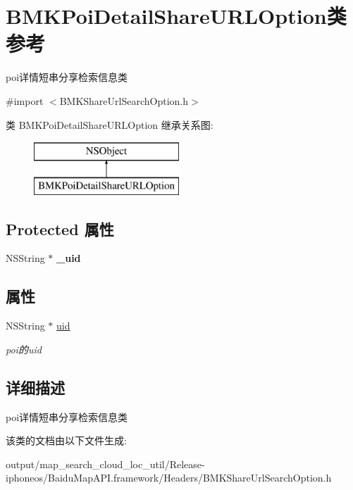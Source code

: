 \hypertarget{interface_b_m_k_poi_detail_share_u_r_l_option}{}\section{B\+M\+K\+Poi\+Detail\+Share\+U\+R\+L\+Option类 参考}
\label{interface_b_m_k_poi_detail_share_u_r_l_option}


poi详情短串分享检索信息类  




{\ttfamily \#import $<$B\+M\+K\+Share\+Url\+Search\+Option.\+h$>$}

类 B\+M\+K\+Poi\+Detail\+Share\+U\+R\+L\+Option 继承关系图\+:\begin{figure}[H]
\begin{center}
\leavevmode
\includegraphics[height=2.000000cm]{interface_b_m_k_poi_detail_share_u_r_l_option}
\end{center}
\end{figure}
\subsection*{Protected 属性}
\begin{DoxyCompactItemize}
\item 
\hypertarget{interface_b_m_k_poi_detail_share_u_r_l_option_a5c9e2a4e4a0ccda38ae749a38f74184f}{}N\+S\+String $\ast$ {\bfseries \+\_\+uid}\label{interface_b_m_k_poi_detail_share_u_r_l_option_a5c9e2a4e4a0ccda38ae749a38f74184f}

\end{DoxyCompactItemize}
\subsection*{属性}
\begin{DoxyCompactItemize}
\item 
\hypertarget{interface_b_m_k_poi_detail_share_u_r_l_option_ae0e491dbe434887138d5d6022c0ad9e2}{}N\+S\+String $\ast$ \hyperlink{interface_b_m_k_poi_detail_share_u_r_l_option_ae0e491dbe434887138d5d6022c0ad9e2}{uid}\label{interface_b_m_k_poi_detail_share_u_r_l_option_ae0e491dbe434887138d5d6022c0ad9e2}

\begin{DoxyCompactList}\small\item\em poi的uid \end{DoxyCompactList}\end{DoxyCompactItemize}


\subsection{详细描述}
poi详情短串分享检索信息类 

该类的文档由以下文件生成\+:\begin{DoxyCompactItemize}
\item 
output/map\+\_\+search\+\_\+cloud\+\_\+loc\+\_\+util/\+Release-\/iphoneos/\+Baidu\+Map\+A\+P\+I.\+framework/\+Headers/B\+M\+K\+Share\+Url\+Search\+Option.\+h\end{DoxyCompactItemize}
